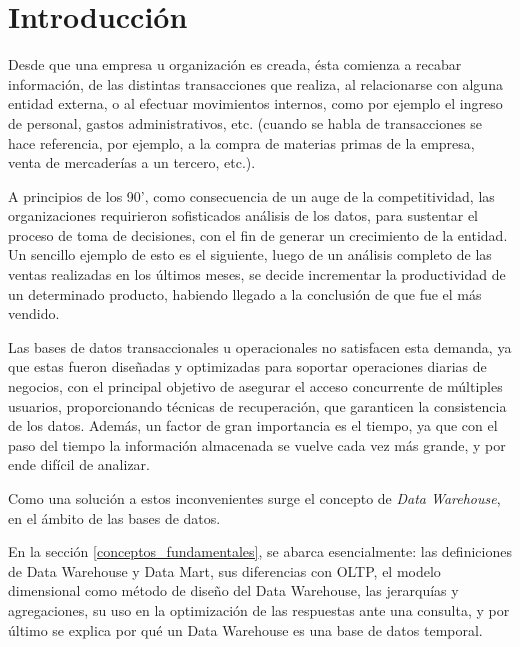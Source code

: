 \documentclass[a4paper,11pt]{article}
\begin{document}
  
  
    \section{Introducción}

    Desde que una empresa u organización es creada, ésta comienza a recabar información, de las distintas transacciones que realiza, al relacionarse
    con alguna entidad externa, o al efectuar movimientos internos, como por ejemplo el ingreso de personal, gastos administrativos,
    etc. (cuando se habla de transacciones se hace referencia, por ejemplo, a la compra de materias primas de la empresa, venta de mercaderías a un tercero,
    etc.).
    
    A principios de los 90', como consecuencia de un auge de la competitividad, las organizaciones requirieron sofisticados análisis de los datos, para sustentar
    el proceso de toma de decisiones, con el fin de generar un crecimiento de la entidad.
    Un sencillo ejemplo de esto es el siguiente, luego de un análisis completo de las ventas realizadas en los últimos meses, se decide incrementar la  productividad
    de un determinado producto, habiendo llegado a la conclusión de que fue el más vendido.
    
    Las bases de datos transaccionales u operacionales no satisfacen esta demanda, ya que estas fueron diseñadas y
    optimizadas para soportar operaciones diarias de negocios, con el principal objetivo de asegurar el acceso concurrente de múltiples usuarios, proporcionando
    técnicas de recuperación, que garanticen la consistencia de los datos.
    Además, un factor de gran importancia es el tiempo, ya que con el paso del tiempo la información almacenada se vuelve cada vez más grande,
    y por ende difícil de analizar.
    
    
    Como una solución a estos inconvenientes surge el concepto de \textit{Data Warehouse}, en el ámbito de las bases de datos.
    
    En la sección \ref{conceptos_fundamentales}, se abarca esencialmente: las definiciones de Data Warehouse y Data Mart, sus diferencias con OLTP,
    el modelo dimensional como método de diseño del Data Warehouse, las jerarquías y agregaciones, su uso en la optimización de las respuestas ante una consulta,
    y por último se explica por qué un Data Warehouse es una base de datos temporal.
    
\end{document}
